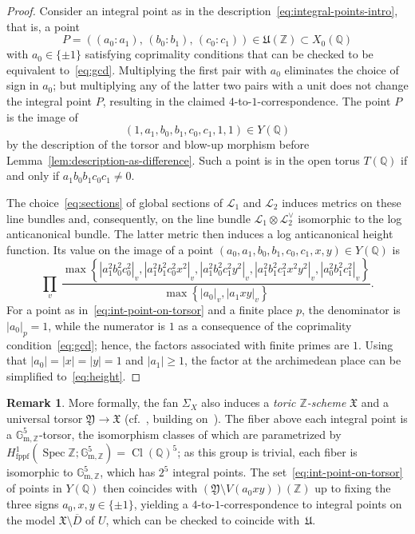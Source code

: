 \documentclass[a4paper, twoside, 10pt]{amsart}
\newcommand{\cL}{\mathcal{L}}
\newcommand{\mU}{\mathfrak{U}}
\newcommand{\mX}{\mathfrak{X}}
\newcommand{\mY}{\mathfrak{Y}}
\newcommand{\ZZ}{\mathbb{Z}}
\newcommand{\GmZ}{\mathbb{G}_{\mathrm{m},\mathbb{Z}}}
\newcommand{\QQ}{\mathbb{Q}}
\DeclareMathOperator{\Cl}{Cl}
\DeclareMathOperator{\Spec}{Spec}
\newcommand{\abs}[1]{\left\lvert#1\right\rvert}
\newcommand{\fppf}{\mathrm{fppf}}
\theoremstyle{definition}
\newtheorem{remark}[theorem]{Remark}
\begin{document}
\begin{proof}
  Consider an integral point as in the description~\eqref{eq:integral-points-intro}, that is, a point
  \[
    P=\left((a_0:a_1),\, (b_0:b_1),\, (c_0:c_1)\right) \in \mU(\ZZ)\subset X_0(\QQ)
  \]
  with $a_0\in\{\pm 1\}$ satisfying coprimality conditions that can be checked to be equivalent to~\eqref{eq:gcd}.
  Multiplying the first pair with $a_0$ eliminates the choice of sign in $a_0$; but multiplying any of the latter two pairs with a unit does not change the integral point $P$, resulting in the claimed $4$-to-$1$-correspondence. The point $P$ is the image of
  \begin{equation}\label{eq:int-point-on-torsor}
    (1,a_1,b_0,b_1,c_0,c_1,1,1)\in Y(\QQ)
  \end{equation}
  by the description of the torsor and blow-up morphism before Lemma~\ref{lem:description-as-difference}.
  Such a point is in the open torus $T(\QQ)$ if and only if $a_1b_0b_1c_0c_1\neq 0$.

  The choice~\eqref{eq:sections} of global sections of $\cL_1$ and $\cL_2$ induces metrics on these line bundles and, consequently, on the line bundle $\cL_1 \otimes \cL_2^\vee$ isomorphic to the log anticanonical bundle. The latter metric then induces a log anticanonical height function. Its value on the image of a point $(a_0,a_1,b_0,b_1,c_0,c_1,x,y)\in Y(\QQ)$ is
  \[
    \prod_{v}\ 
    \frac{\max
    \left\{\abs{a_1^2b_0^2c_0^2}_v,
      \abs{a_1^2b_1^2c_0^2x^2}_v,
      \abs{a_1^2b_0^2c_1^2y^2}_v,
      \abs{a_1^2b_1^2c_1^2x^2y^2}_v,
      \abs{a_0^2b_1^2c_1^2}_v
    \right\}}{
      \max\left\{\abs{a_0}_v, \abs{a_1xy}_v\right\}
    }\text{.}
  \]
  For a point as in~\eqref{eq:int-point-on-torsor} and a finite place $p$, the denominator is $\abs{a_0}_p = 1$, while the numerator is $1$ as a consequence of the coprimality condition~\eqref{eq:gcd}; hence, the factors associated with finite primes are $1$.
  Using that $\abs{a_0}=\abs{x}=\abs{y}=1$ and $\abs{a_1}\ge 1$, the factor at the archimedean place can be simplified to~\eqref{eq:height}. 
\end{proof}

\begin{remark}
  More formally, the fan $\Sigma_X$ also induces a \emph{toric $\ZZ$-scheme} $\mX$ and a universal torsor $\mY\to\mX$ (cf.~\cite[p.~187 and Rem.~8.6~(b)]{MR1679841}, building on~\cite{MR0284446}). The fiber above each integral point is a $\GmZ^5$-torsor, the isomorphism classes of which are parametrized by $H^1_{\fppf}(\Spec \ZZ; \GmZ^5) = \Cl(\QQ)^5$; as this group is trivial, each fiber is isomorphic to $\GmZ^5$, which has $2^5$ integral points. The set~\eqref{eq:int-point-on-torsor} of points in $Y(\QQ)$ then coincides with $(\mY\setminus V(a_0xy))(\ZZ)$ up to fixing the three signs $a_0,x,y\in\{\pm 1\}$, yielding a $4$-to-$1$-correspondence to integral points on the model $\mX\setminus \overline{D}$ of $U$, which can be checked to coincide with~$\mU$.
\end{remark}
\end{document}
